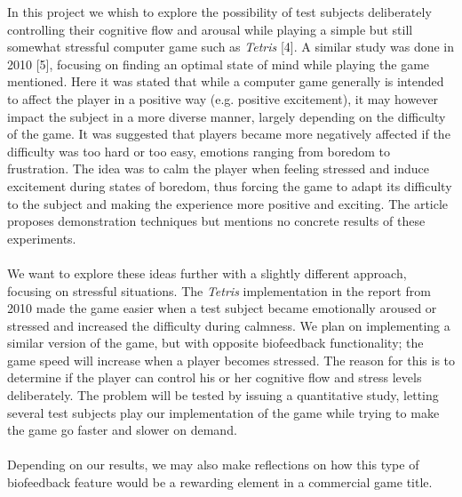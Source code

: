 \documentclass[paper=a4, fontsize=11pt]{scrartcl} %
\numberwithin{equation}{section} %
\numberwithin{figure}{section} %
\numberwithin{table}{section} %
\begin{document}
In this project we whish to explore the possibility of test subjects deliberately controlling their cognitive flow and arousal while playing a simple but still somewhat stressful computer game such as \textit{Tetris} [4]. A similar study was done in 2010 [5], focusing on finding an optimal state of mind while playing the game mentioned. Here it was stated that while a computer game generally is intended to affect the player in a positive way (e.g. positive excitement), it may however impact the subject in a more diverse manner, largely depending on the difficulty of the game. It was suggested that players became more negatively affected if the difficulty was too hard or too easy, emotions ranging from boredom to frustration. The idea was to calm the player when feeling stressed and induce excitement during states of boredom, thus forcing the game to adapt its difficulty to the subject and making the experience more positive and exciting. The article proposes demonstration techniques but mentions no concrete results of these experiments.
\\ \\
We want to explore these ideas further with a slightly different approach, focusing on stressful situations. The \textit{Tetris} implementation in the report from 2010 made the game easier when a test subject became emotionally aroused or stressed and increased the difficulty during calmness. We plan on implementing a similar version of the game, but with opposite biofeedback functionality; the game speed will increase when a player becomes stressed. The reason for this is to determine if the player can control his or her cognitive flow and stress levels deliberately. The problem will be tested by issuing a quantitative study, letting several test subjects play our implementation of the game while trying to make the game go faster and slower on demand.
\\ \\
Depending on our results, we may also make reflections on how this type of biofeedback feature would be a rewarding element in a commercial game title.

\end{document}
